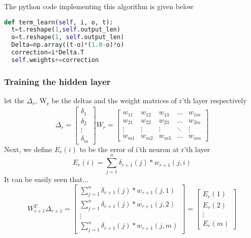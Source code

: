 \documentclass{proc}
\begin{document}
	The python code implementing this algorithm is given below
	\begin{lstlisting}[language=Python]
def term_learn(self, i, o, t):
  t=t.reshape(1,self.output_len)
  o=t.reshape(1, self.output_len)
  Delta=np.array((t-o)*(1.0-o)*o)
  correction=i*Delta.T
  self.weights+=correction
	\end{lstlisting}
	\subsubsection{Training the hidden layer}
	let the $\Delta_r$, W\textsubscript{r} be the deltas and the weight matrices  of r'th layer respectively
	\[
	\Delta_r=
	\begin{bmatrix}
	\delta_1\\
	\delta_2\\
	\vdots\\
	\delta_m
	\end{bmatrix} 	 
	W_r=
	\begin{bmatrix}
	w_{11} & w_{12} & w_{13} & \dots  & w_{1m} \\
	w_{21} & w_{22} & w_{23} & \dots  & w_{2m} \\
	\vdots & \vdots & \vdots & \ddots & \vdots \\
	w_{m1} & w_{m2} & w_{m3} & \dots  & w_{nm}
	\end{bmatrix} 
	\]
	Next, we define ${E_r(i)}$ to be the error of i'th neuron at r'th layer
	\[ E_r(i)=\sum_{j=1}^{n} \delta_{r+1}(j)*w_{r+1}(j,i)  \]
	It can be easily seen that...
	\[
	W_{r+1}^T\Delta_{r+1}=
	\begin{bmatrix}
	\sum_{j=1}^{n} \delta_{r+1}(j)*w_{r+1}(j,1)\\
	\sum_{j=1}^{n} \delta_{r+1}(j)*w_{r+1}(j,2)\\
	\vdots\\
	\sum_{j=1}^{n} \delta_{r+1}(j)*w_{r+1}(j,m)
	\end{bmatrix} 
	=
	\begin{bmatrix}
	 E_r(1)\\
	 E_r(2)\\
	\vdots\\
	 E_r(m)
	\end{bmatrix} 
	\]
	
\end{document}
